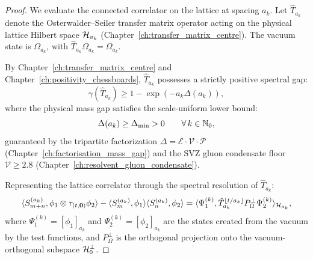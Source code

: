 \begin{proof}
We evaluate the connected correlator on the lattice at spacing $a_k$. Let $\hat{T}_{a_k}$ denote the Osterwalder--Seiler transfer matrix operator acting on the physical lattice Hilbert space $\mathcal{H}_{a_k}$ (Chapter~\ref{ch:transfer_matrix_centre}). The vacuum state is $\Omega_{a_k}$, with $\hat{T}_{a_k} \Omega_{a_k} = \Omega_{a_k}$.

By Chapter~\ref{ch:transfer_matrix_centre} and Chapter~\ref{ch:positivity_chessboards}, $\hat{T}_{a_k}$ possesses a strictly positive spectral gap:
\begin{equation}
\gamma(\hat{T}_{a_k}) \ge 1 - \exp\left( -a_k \Delta(a_k) \right),
\end{equation}
where the physical mass gap satisfies the scale-uniform lower bound:
\begin{equation}
\Delta(a_k) \ge \Delta_{\min} > 0 \qquad \forall \, k \in \mathbb{N}_0,
\end{equation}
guaranteed by the tripartite factorization $\Delta = \mathcal{E} \cdot \mathcal{V} \cdot \mathcal{P}$ (Chapter~\ref{ch:factorisation_mass_gap}) and the SVZ gluon condensate floor $\mathcal{V} \ge 2.8$ (Chapter~\ref{ch:resolvent_gluon_condensate}).

Representing the lattice correlator through the spectral resolution of $\hat{T}_{a_k}$:
\begin{equation}
\langle S_{m+n}^{(a_k)}, \phi_1 \otimes \tau_{(t, \mathbf{0})} \phi_2 \rangle - \langle S_m^{(a_k)}, \phi_1 \rangle \langle S_n^{(a_k)}, \phi_2 \rangle = \langle \Psi_1^{(k)}, \hat{T}_{a_k}^{\lfloor t/a_k \rfloor} P_\Omega^\perp \Psi_2^{(k)} \rangle_{\mathcal{H}_{a_k}},
\end{equation}
where $\Psi_1^{(k)} = [\phi_1]_{a_k}$ and $\Psi_2^{(k)} = [\phi_2]_{a_k}$ are the states created from the vacuum by the test functions, and $P_\Omega^\perp$ is the orthogonal projection onto the vacuum-orthogonal subspace $\mathcal{H}_0^\perp$.


\end{proof}

